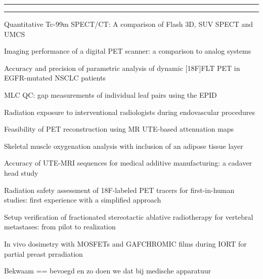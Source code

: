 \documentclass[a4paper,10pt]{report}
\begin{document}
\begin{multicols*}{3}
\vfill


\hrule\vspace{2mm}
\vspace{2mm}\hrule

\begin{packed_enum}
\item[\#1] Quantitative Tc-99m SPECT/CT: A com\-par\-i\-son of Flash 3D, SUV SPECT and UMCS
\item[\#2] Imaging performance of a digital PET scanner: a com\-par\-i\-son to analog systems
\item[\#3] Accuracy and precision of parametric analysis of dynamic [18F]FLT PET in EGFR-mutated NSCLC patients
\item[\#4] MLC QC: gap measurements of individual leaf pairs using the EPID
\item[\#5] Radiation exposure to interventional radiologists during endovascular procedures
\item[\#6] Feasibility of PET reconstruction using MR UTE-based attenuation maps
\item[\#7] Skeletal muscle oxygenation analysis with inclusion of an adipose tissue layer
\item[\#8] Accuracy of UTE-MRI sequences for medical additive manufacturing: a cadaver head study
\item[\#9] Radiation safety assessment of 18F-labeled PET tracers for first-in-human studies: first experience with a simplified approach
\item[\#10] Setup verification of fractionated stereotactic ablative radiotherapy for vertebral metastases: from pilot to realization
\item[\#11] In vivo dosimetry with MOSFETs and GAFCHROMIC films during IORT for partial preast prradiation
\item[\#12] Bekwaam == bevoegd en zo doen we dat bij medische apparatuur %
\end{packed_enum}



\end{multicols*}
\end{document}
